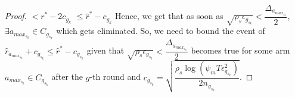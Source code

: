 \begin{proof}
\newline\hspace*{14em}$< r^{*} -2c_{g_{k}} $
\newline\hspace*{14em}$\leq \hat{r}^{*} - c_{g_{k}}$
\newline Hence, we get that as soon as $\sqrt{\rho_{s}\epsilon_{g_{s_{k}}}}<\dfrac{\Delta_{a_{max_{s_{k}}}}}{2}$, $\exists a_{max_{s_{k}}}\in C_{g_{s_{k}}}$ which gets eliminated.
\newline So, we need to bound the event of $\hat{r}_{a_{max_{s_{k}}}}+c_{g_{s_{k}}}\leq \hat{r}^{*}-c_{g_{s_{k}}}$ given that $\sqrt{\rho_{s}\epsilon_{g_{s_{k}}}}<\dfrac{\Delta_{a_{max_{s_{k}}}}}{2}$ becomes true for some arm $a_{max_{s_{k}}}\in C_{g_{s_{k}}}$ after the $g$-th round and $c_{g_{s_{k}}}=\sqrt{\dfrac{\rho_{s} \log (\psi_{m}T\epsilon_{g_{s_{k}}}^{2})}{2 n_{g_{s_{k}}}}}$.


\end{proof}
